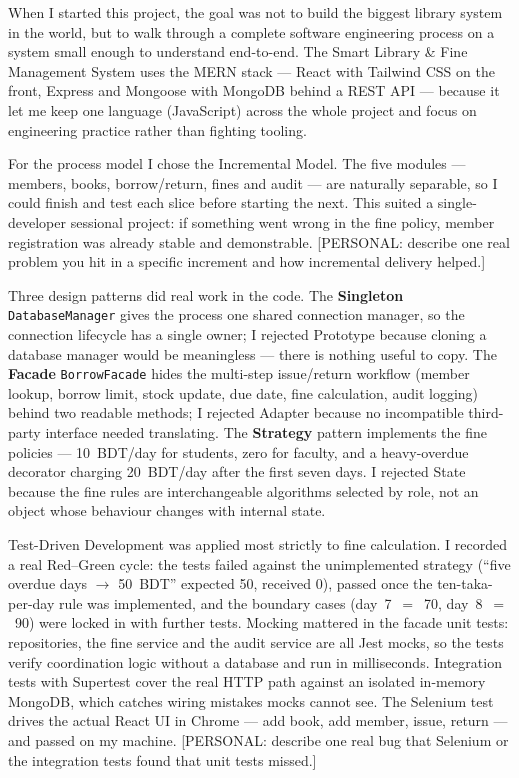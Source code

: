 When I started this project, the goal was not to build the biggest library
system in the world, but to walk through a complete software engineering
process on a system small enough to understand end-to-end. The Smart Library
\& Fine Management System uses the MERN stack --- React with Tailwind CSS on
the front, Express and Mongoose with MongoDB behind a REST API --- because it
let me keep one language (JavaScript) across the whole project and focus on
engineering practice rather than fighting tooling.

For the process model I chose the Incremental Model. The five modules ---
members, books, borrow/return, fines and audit --- are naturally separable,
so I could finish and test each slice before starting the next. This suited
a single-developer sessional project: if something went wrong in the fine
policy, member registration was already stable and demonstrable.
[PERSONAL: describe one real problem you hit in a specific increment and how
incremental delivery helped.]

Three design patterns did real work in the code. The \textbf{Singleton}
\texttt{DatabaseManager} gives the process one shared connection manager, so
the connection lifecycle has a single owner; I rejected Prototype because
cloning a database manager would be meaningless --- there is nothing useful
to copy. The \textbf{Facade} \texttt{BorrowFacade} hides the multi-step
issue/return workflow (member lookup, borrow limit, stock update, due date,
fine calculation, audit logging) behind two readable methods; I rejected
Adapter because no incompatible third-party interface needed translating.
The \textbf{Strategy} pattern implements the fine policies --- 10~BDT/day
for students, zero for faculty, and a heavy-overdue decorator charging
20~BDT/day after the first seven days. I rejected State because the fine
rules are interchangeable algorithms selected by role, not an object whose
behaviour changes with internal state.

Test-Driven Development was applied most strictly to fine calculation. I
recorded a real Red--Green cycle: the tests failed against the unimplemented
strategy (``five overdue days $\rightarrow$ 50~BDT'' expected 50, received
0), passed once the ten-taka-per-day rule was implemented, and the boundary
cases (day~7~$=$~70, day~8~$=$~90) were locked in with further tests.
Mocking mattered in the facade unit tests: repositories, the fine service
and the audit service are all Jest mocks, so the tests verify coordination
logic without a database and run in milliseconds. Integration tests with
Supertest cover the real HTTP path against an isolated in-memory MongoDB,
which catches wiring mistakes mocks cannot see. The Selenium test drives the
actual React UI in Chrome --- add book, add member, issue, return --- and
passed on my machine.
[PERSONAL: describe one real bug that Selenium or the integration tests
found that unit tests missed.]

